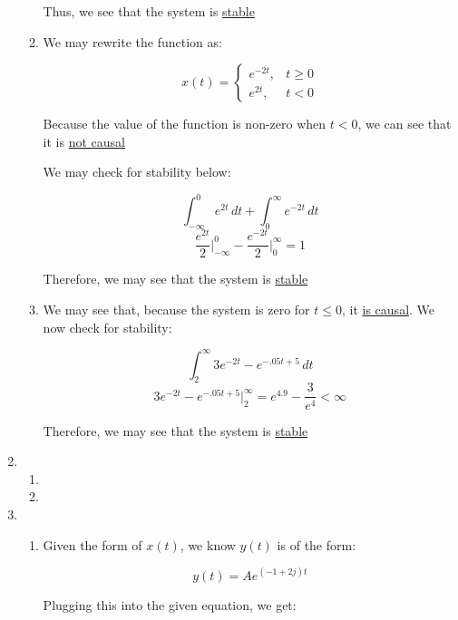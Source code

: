 \begin{enumerate}
\begin{enumerate}
        Thus, we see that the system is \underline{stable}

      \item 

        We may rewrite the function as:

        $$x(t)=\left\{\begin{array}{ll} e^{-2t}, & t\geq0\\ e^{2t}, & t<0\end{array}$$

        Because the value of the function is non-zero when $t<0$, we can see that it is \underline{not causal}

        We may check for stability below:

        $$\int_{-\infty}^{0} e^{2t}\,dt + \int_0^{\infty} e^{-2t}\,dt$$
        $$\frac{e^{2t}}{2}\Big|_{-\infty}^0-\frac{e^{-2t}}{2}\Big|_0^{\infty}=1$$

        Therefore, we may see that the system is \underline{stable}

      \item We may see that, because the system is zero for $t\leq 0$, it \underline{is causal}. We now check for stability:

        $$\int_2^{\infty} 3e^{-2t}-e^{-.05t+5}\,dt$$
        $$3e^{-2t}-e^{-.05t+5}\Big|_2^{\infty}=e^{4.9}-\frac{3}{e^4}<\infty$$

        Therefore, we may see that the system is \underline{stable}

    \end{enumerate}

  \item

    \begin{enumerate}

      \item 

      \item 

    \end{enumerate}

  \item

    \begin{enumerate}

      \item Given the form of $x(t)$, we know $y(t)$ is of the form:

        $$y(t)=Ae^{(-1+2j)t}$$

        Plugging this into the given equation, we get:


\end{enumerate}
\end{enumerate}

